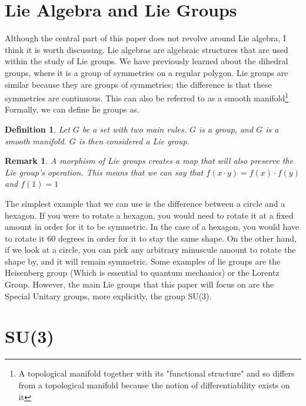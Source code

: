 \documentclass[12pt,journal,compsoc]{IEEEtran}
\newtheorem{definition}{Definition}
\newtheorem*{rem}{Remark}
\begin{document}
\section{Lie Algebra and Lie Groups}
Although the central part of this paper does not revolve around Lie algebra, I think it is worth discussing. Lie algebras are algebraic structures that are used within the study of Lie groups. We have previously learned about the dihedral groups, where it is a group of symmetries on a regular polygon. Lie groups are similar because they are groups of symmetries; the difference is that these symmetries are continuous. This can also be referred to as a smooth manifold\footnote{A topological manifold together with its "functional structure" and so differs from a topological manifold because the notion of differentiability exists on it} Formally, we can define lie groups as. \\
\begin{definition}
Let $G$ be a set with two main rules. $G$ is a group, and $G$ is a smooth manifold. $G$ is then considered a Lie group.
\end{definition}	
\begin{rem}
A morphism of Lie groups creates a map that will also preserve the Lie group's operation. This means that we can say that $f(x \cdot y) = f(x) \cdot f(y)$ and $f(1) = 1$
\end{rem}
The simplest example that we can use is the difference between a circle and a hexagon. If you were to rotate a hexagon, you would need to rotate it at a fixed amount in order for it to be symmetric. In the case of a hexagon, you would have to rotate it 60 degrees in order for it to stay the same shape. On the other hand, if we look at a circle, you can pick any arbitrary minuscule amount to rotate the shape by, and it will remain symmetric. Some examples of lie groups are the Heisenberg group (Which is essential to quantum mechanics) or the Lorentz Group. However, the main Lie groups that this paper will focus on are the Special Unitary groups, more explicitly, the group SU(3).


\section{SU(3)}
\end{document}
